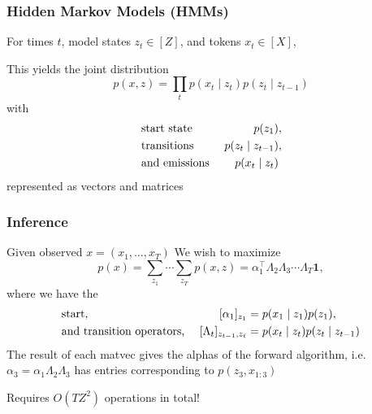 \documentclass{beamer}
\begin{document}
\begin{frame}
\frametitle{Hidden Markov Models (HMMs)}

For times $t$, model states $z_t \in [Z]$, and tokens $x_t \in [X]$,

\begin{center}
\end{center}

This yields the joint distribution
$$p(x,z) = \prod_t p(x_t \mid z_t)p(z_t \mid z_{t-1})$$
%
with 
\begin{align*}
&\textnormal{start state } & p(z_1)&,\\
&\textnormal{transitions } & p(z_t \mid z_{t-1})&,\\
&\textnormal{and emissions } &  p(x_t \mid z_t)&
\end{align*}
represented as vectors and matrices

\end{frame}



\begin{frame}
\frametitle{Inference}
Given observed $x = (x_1, \ldots, x_T)$
\vspace{1em}
We wish to maximize
\begin{equation*}
p(x)
= \sum_{z_1}\cdots\sum_{z_T}p(x, z)
= \alpha_1^\top\Lambda_2\Lambda_3\cdots\Lambda_T\bm1,
\end{equation*}
where we have the
\begin{align*}
&\textnormal{start, } & [\alpha_1]_{z_1} &= p(x_1\mid z_1)p(z_1),\\
&\textnormal{and transition operators, }
    & [\Lambda_t]_{z_{t-1},z_t} &= p(x_t \mid z_t)p(z_t \mid z_{t-1})
\end{align*}
The result of each matvec gives the alphas of the forward algorithm,
i.e. $\alpha_3 = \alpha_1\Lambda_2\Lambda_3$ has entries corresponding to $p(z_3, x_{1:3})$

\vspace{1em}
Requires $O(TZ^2)$ operations in total!
\end{frame}
\end{document}
